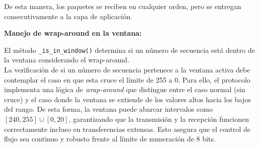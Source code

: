De esta manera, los paquetes se reciben en cualquier orden, pero se entregan consecutivamente a la capa de aplicación.

\textbf{Manejo de wrap-around en la ventana:}

El método \texttt{\_is\_in\_window()} determina si un número de secuencia está dentro de la ventana considerando el wrap-around.
\\

La verificación de si un número de secuencia pertenece a la ventana activa debe contemplar el caso en que esta cruce el límite de 255 a 0. Para ello, el protocolo implementa una lógica de \textit{wrap-around} que distingue entre el caso normal (sin cruce) y el caso donde la ventana se extiende de los valores altos hacia los bajos del rango.  
De esta forma, la ventana puede abarcar intervalos como \([240, 255] \cup [0, 20]\), garantizando que la transmisión y la recepción funcionen correctamente incluso en transferencias extensas. Esto asegura que el control de flujo sea continuo y robusto frente al límite de numeración de 8 bits.